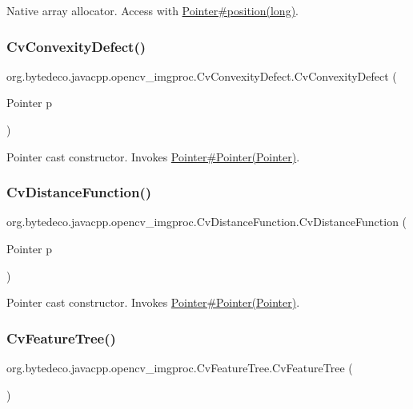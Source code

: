 Native array allocator. Access with \hyperlink{}{Pointer\#position(long)}. \mbox{\label{group__imgproc_ga3ad9202789ae5ba03887b3a07a817674}} 
\subsubsection{\texorpdfstring{Cv\+Convexity\+Defect()}{CvConvexityDefect()}\hspace{0.1cm}{\footnotesize\ttfamily [3/3]}}
{\footnotesize\ttfamily org.\+bytedeco.\+javacpp.\+opencv\+\_\+imgproc.\+Cv\+Convexity\+Defect.\+Cv\+Convexity\+Defect (\begin{DoxyParamCaption}\item[{Pointer}]{p }\end{DoxyParamCaption})\hspace{0.3cm}{\ttfamily [inline]}}

Pointer cast constructor. Invokes \hyperlink{}{Pointer\#\+Pointer(\+Pointer)}. \mbox{\label{group__imgproc_ga13bd67072322fa3abbf57c43e0b0b43e}} 
\subsubsection{\texorpdfstring{Cv\+Distance\+Function()}{CvDistanceFunction()}}
{\footnotesize\ttfamily org.\+bytedeco.\+javacpp.\+opencv\+\_\+imgproc.\+Cv\+Distance\+Function.\+Cv\+Distance\+Function (\begin{DoxyParamCaption}\item[{Pointer}]{p }\end{DoxyParamCaption})\hspace{0.3cm}{\ttfamily [inline]}}

Pointer cast constructor. Invokes \hyperlink{}{Pointer\#\+Pointer(\+Pointer)}. \mbox{\label{group__imgproc_ga64f131e4a0b5b9bba476aeb72e312149}} 
\subsubsection{\texorpdfstring{Cv\+Feature\+Tree()}{CvFeatureTree()}\hspace{0.1cm}{\footnotesize\ttfamily [1/2]}}
{\footnotesize\ttfamily org.\+bytedeco.\+javacpp.\+opencv\+\_\+imgproc.\+Cv\+Feature\+Tree.\+Cv\+Feature\+Tree (\begin{DoxyParamCaption}{ }\end{DoxyParamCaption})\hspace{0.3cm}{\ttfamily [inline]}}

